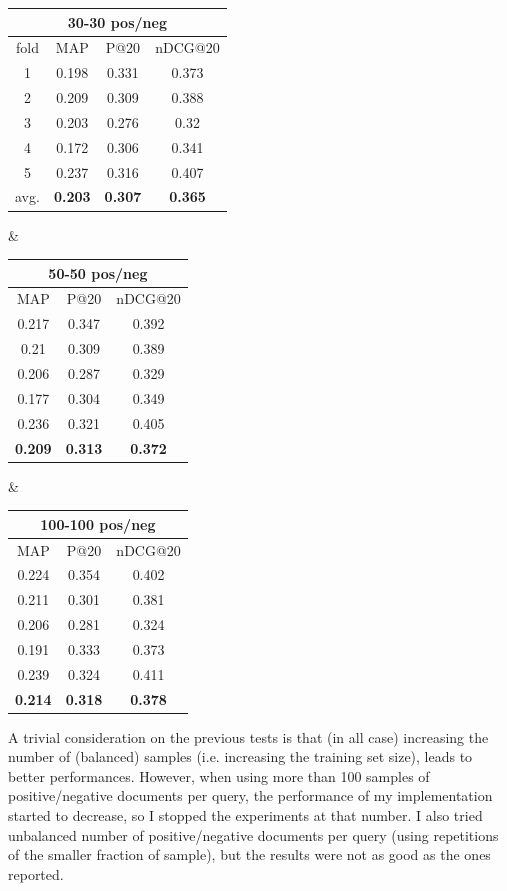 \begin{adjustbox}{center, tabular=ccc, caption={DRMM runs (logarithm normalized histograms), IDF weighting, stemmed with stopwords removal}, nofloat=table}
\centering
\begin{tabular}{c|ccc}
\hline
\multicolumn{4}{c}{30-30 pos/neg} \\ \hline
fold & MAP & P@20 & nDCG@20 \\ \hline
1 & 0.198 & 0.331 & 0.373 \\
2 & 0.209 & 0.309 & 0.388 \\
3 & 0.203 & 0.276 & 0.32 \\
4 & 0.172 & 0.306 & 0.341 \\
5 & 0.237 & 0.316 & 0.407 \\ \hline
avg. & \textbf{0.203} & \textbf{0.307} & \textbf{0.365} \\
\hline
\end{tabular} &
\begin{tabular}{ccc}
\hline
\multicolumn{3}{c}{50-50 pos/neg} \\ \hline
MAP & P@20 & nDCG@20 \\ \hline
0.217 & 0.347 & 0.392 \\
0.21 & 0.309 & 0.389 \\
0.206 & 0.287 & 0.329 \\
0.177 & 0.304 & 0.349 \\
0.236 & 0.321 & 0.405 \\ \hline
\textbf{0.209} & \textbf{0.313} & \textbf{0.372} \\
\hline
\end{tabular} &
\begin{tabular}{ccc}
\hline
\multicolumn{3}{c}{100-100 pos/neg} \\ \hline
MAP & P@20 & nDCG@20 \\ \hline
0.224 & 0.354 & 0.402 \\
0.211 & 0.301 & 0.381 \\
0.206 & 0.281 & 0.324 \\
0.191 & 0.333 & 0.373 \\
0.239 & 0.324 & 0.411 \\ \hline
\textbf{0.214} & \textbf{0.318} & \textbf{0.378} \\
\hline
\end{tabular}
\label{tab:lchsamp}
\end{adjustbox}

A trivial consideration on the previous tests is that (in all case) increasing the number of (balanced) samples (i.e. increasing the training set size), leads to better performances.
However, when using more than 100 samples of positive/negative documents per query, the performance of my implementation started to decrease, so I stopped the experiments at that number.
I also tried unbalanced number of positive/negative documents per query (using repetitions of the smaller fraction of sample), but the results were not as good as the ones reported.

